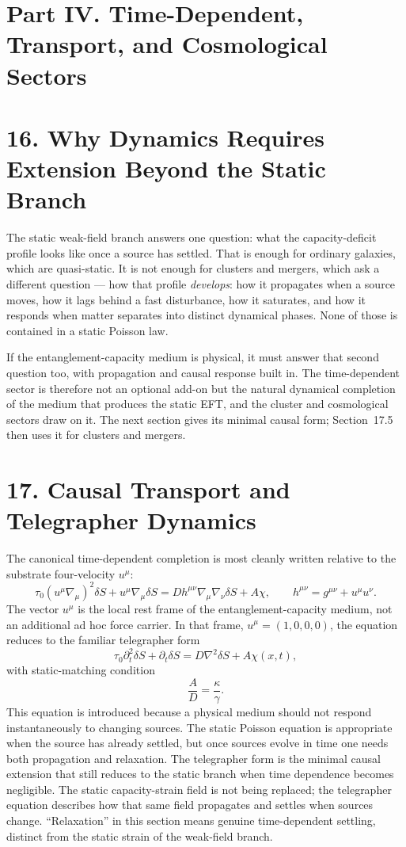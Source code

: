 \documentclass[11pt]{article}
\begin{document}
\section*{Part IV. Time-Dependent, Transport, and Cosmological Sectors}

\section{16. Why Dynamics Requires Extension Beyond the Static Branch}

The static weak-field branch answers one question: what the capacity-deficit profile looks like once a source has settled. That is enough for ordinary galaxies, which are quasi-static. It is not enough for clusters and mergers, which ask a different question --- how that profile \emph{develops}: how it propagates when a source moves, how it lags behind a fast disturbance, how it saturates, and how it responds when matter separates into distinct dynamical phases. None of those is contained in a static Poisson law.

If the entanglement-capacity medium is physical, it must answer that second question too, with propagation and causal response built in. The time-dependent sector is therefore not an optional add-on but the natural dynamical completion of the medium that produces the static EFT, and the cluster and cosmological sectors draw on it. The next section gives its minimal causal form; Section~17.5 then uses it for clusters and mergers.

\section{17. Causal Transport and Telegrapher Dynamics}

The canonical time-dependent completion is most cleanly written relative to the substrate four-velocity $u^\mu$:
\[
\tau_0(u^\mu\nabla_\mu)^2\delta S
+u^\mu\nabla_\mu\delta S
=
D h^{\mu\nu}\nabla_\mu\nabla_\nu\delta S
+A\chi,
\qquad
h^{\mu\nu}=g^{\mu\nu}+u^\mu u^\nu .
\]
The vector $u^\mu$ is the local rest frame of the entanglement-capacity medium, not an additional ad hoc force carrier. In that frame, $u^\mu=(1,0,0,0)$, the equation reduces to the familiar telegrapher form
\[
\tau_0\partial_t^2\delta S+\partial_t\delta S
=
D\nabla^2\delta S+A\chi(x,t),
\]
with static-matching condition
\[
\frac{A}{D}=\frac{\kappa}{\gamma}.
\]
This equation is introduced because a physical medium should not respond instantaneously to changing sources. The static Poisson equation is appropriate when the source has already settled, but once sources evolve in time one needs both propagation and relaxation. The telegrapher form is the minimal causal extension that still reduces to the static branch when time dependence becomes negligible. The static capacity-strain field is not being replaced; the telegrapher equation describes how that same field propagates and settles when sources change. ``Relaxation'' in this section means genuine time-dependent settling, distinct from the static strain of the weak-field branch.
\end{document}
